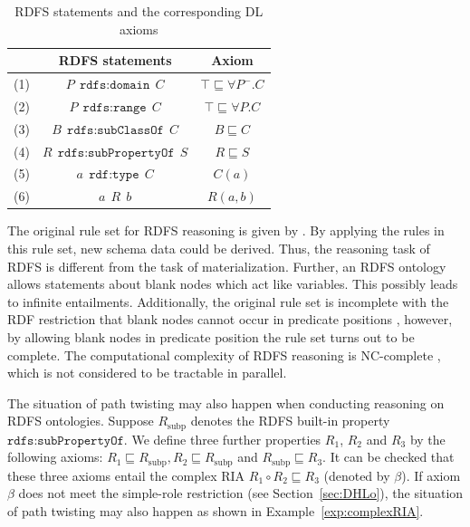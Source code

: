 \begin{table}
\centering
\caption{RDFS statements and the corresponding DL axioms}
{\setlength{\tabcolsep}{6mm}
\begin{tabular}{lcc}
\hline
& RDFS statements & Axiom\\
\hline
\hline
(1)&$P~~\texttt{rdfs:domain}~~C$& $\top\sqsubseteq\forall P^-.C$\\

(2)&$P~~\texttt{rdfs:range}~~C$& $\top\sqsubseteq\forall P.C$\\

(3)&$B~~\texttt{rdfs:subClassOf}~~C$& $B\sqsubseteq C$\\

(4)&$R~~\texttt{rdfs:subPropertyOf}~~S$& $R\sqsubseteq S$\\
\hline
(5)&$a~~\texttt{rdf:type}~~C$& $C(a)$\\

(6)&$a~~R~~b$& $R(a,b)$\\
\hline
\end{tabular}}
\label{tab:rdfs}
\end{table}




The original rule set for RDFS reasoning is
given by \citet{RDFSrec04}. By applying the rules in this rule set,
new schema data could be derived. Thus, the reasoning task of RDFS
is different from the task of materialization. Further, an RDFS ontology allows
statements about blank nodes which act like variables. This possibly
leads to infinite entailments. Additionally, the original rule set is
incomplete with the RDF restriction that
blank nodes cannot occur in predicate positions \cite{Horst05},
however, by allowing blank nodes in predicate position
the rule set turns out to be complete. The computational complexity
of RDFS reasoning is NC-complete \cite{Horst05},
which is not considered to be tractable in parallel.

The situation of path twisting may also happen when conducting reasoning
on RDFS ontologies. Suppose $R_{\text{subp}}$ denotes the RDFS built-in property $\texttt{rdfs:subPropertyOf}$.
We define three further properties $R_1$, $R_2$ and $R_3$ by the following axioms:
$R_1\sqsubseteq R_{\text{subp}}, R_2\sqsubseteq R_{\text{subp}}$ and $R_{\text{subp}}\sqsubseteq R_3$.
It can be checked that these three axioms entail the complex RIA $R_1\circ R_2\sqsubseteq R_3$ (denoted by $\beta$).
If axiom $\beta$ does not meet the simple-role restriction (see Section~\ref{sec:DHLo}),
the situation of path twisting may also happen as shown in Example~\ref{exp:complexRIA}.

